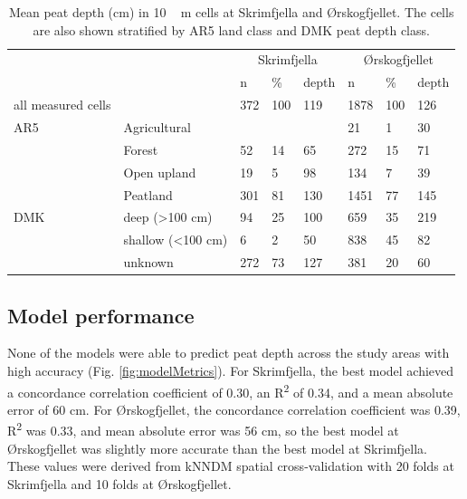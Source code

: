 \documentclass[soil, manuscript]{copernicus}
\begin{document}
\begin{table}[tbp]
\caption{Mean peat depth (cm) in \unit{10\,m} cells at Skrimfjella and Ørskogfjellet. The cells are also shown stratified by AR5 land class and DMK peat depth class.}
\begin{tabular}{llllllll}
\hline
                    &                            & \multicolumn{3}{c}{Skrimfjella} & \multicolumn{3}{c}{Ørskogfjellet} \\ \cline{3-8} 
                    &                            & n        & \%      & depth      & n          & \%      & depth      \\ \hline
all measured cells  &                            & 372      & 100     & 119        & 1878       & 100     & 126        \\
AR5                 & Agricultural               &          &         &            & 21         & 1       & 30         \\
                    & Forest                     & 52       & 14      & 65         & 272        & 15      & 71         \\
                    & Open upland                & 19       & 5       & 98         & 134        & 7       & 39         \\
                    & Peatland                   & 301      & 81      & 130        & 1451       & 77      & 145        \\
DMK                 & deep (\textgreater 100 cm) & 94       & 25      & 100        & 659        & 35      & 219        \\
                    & shallow (\textless 100 cm) & 6        & 2       & 50         & 838        & 45      & 82         \\
                    & unknown                    & 272      & 73      & 127        & 381        & 20      & 60         \\ \hline
\end{tabular}
\label{tab:depthsByClass}
\end{table}

\subsection{Model performance}

None of the models were able to predict peat depth across the study areas with high accuracy (Fig. \ref{fig:modelMetrics}).
For Skrimfjella, the best model achieved a concordance correlation coefficient of 0.30, an R\textsuperscript{2} of 0.34, and a mean absolute error of 60 cm.
For Ørskogfjellet, the concordance correlation coefficient was 0.39, R\textsuperscript{2} was 0.33, and mean absolute error was 56 cm, so the best model at Ørskogfjellet was slightly more accurate than the best model at Skrimfjella.
These values were derived from kNNDM spatial cross-validation with 20 folds at Skrimfjella and 10 folds at Ørskogfjellet.
\end{document}
